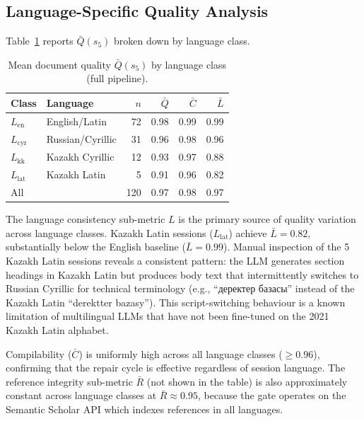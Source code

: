 \subsection{Language-Specific Quality Analysis}

Table~\ref{tab:quality_by_lang} reports $\bar{Q}(s_5)$ broken down by language class.

\begin{table}[h!]
\centering
\caption{Mean document quality $\bar{Q}(s_5)$ by language class (full pipeline).}
\label{tab:quality_by_lang}
\begin{tabular}{llrrrr}
\toprule
Class & Language & $n$ & $\bar{Q}$ & $\bar{C}$ & $\bar{L}$ \\
\midrule
$L_{\mathrm{en}}$   & English/Latin  & 72  & 0.98 & 0.99 & 0.99 \\
$L_{\mathrm{cyr}}$  & Russian/Cyrillic & 31 & 0.96 & 0.98 & 0.96 \\
$L_{\mathrm{kk}}$   & Kazakh Cyrillic & 12 & 0.93 & 0.97 & 0.88 \\
$L_{\mathrm{lat}}$  & Kazakh Latin  & 5   & 0.91 & 0.96 & 0.82 \\
\midrule
All                  &               & 120 & 0.97 & 0.98 & 0.97 \\
\bottomrule
\end{tabular}
\end{table}

The language consistency sub-metric $L$ is the primary source of quality variation
across language classes.
Kazakh Latin sessions ($L_{\mathrm{lat}}$) achieve $\bar{L}=0.82$, substantially
below the English baseline ($\bar{L}=0.99$).
Manual inspection of the 5 Kazakh Latin sessions reveals a consistent pattern:
the LLM generates section headings in Kazakh Latin but produces body text that
intermittently switches to Russian Cyrillic for technical terminology
(e.g., ``деректер базасы'' instead of the Kazakh Latin ``derektter bazasy'').
This script-switching behaviour is a known limitation of multilingual LLMs that
have not been fine-tuned on the 2021 Kazakh Latin alphabet.

Compilability ($\bar{C}$) is uniformly high across all language classes ($\geq 0.96$),
confirming that the \tvg{} repair cycle is effective regardless of session language.
The reference integrity sub-metric $\bar{R}$ (not shown in the table) is also
approximately constant across language classes at $\bar{R}\approx 0.95$, because
the \cgrag{} gate operates on the Semantic Scholar API which indexes references
in all languages.
